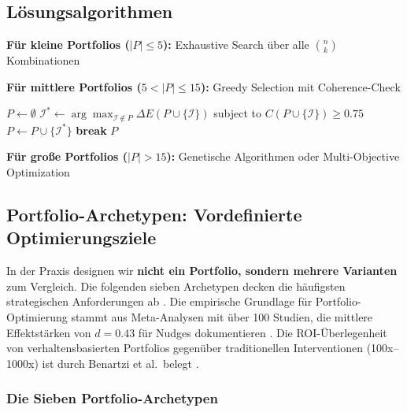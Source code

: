 \subsection{Lösungsalgorithmen}

\textbf{Für kleine Portfolios ($|P| \leq 5$):} Exhaustive Search über alle $\binom{n}{k}$ Kombinationen

\textbf{Für mittlere Portfolios ($5 < |P| \leq 15$):} Greedy Selection mit Coherence-Check

\begin{algorithm}[H]
\caption{Greedy Portfolio Construction}
\label{alg:20-greedy}
\begin{algorithmic}[1]
\State $P \leftarrow \emptyset$
    \State $\mathcal{I}^* \leftarrow \arg\max_{\mathcal{I} \notin P} \Delta E(P \cup \{\mathcal{I}\})$ subject to $C(P \cup \{\mathcal{I}\}) \geq 0.75$
        \State $P \leftarrow P \cup \{\mathcal{I}^*\}$
    \Else
        \State \textbf{break}
    \EndIf
\EndWhile
\State \Return $P$
\end{algorithmic}
\end{algorithm}

\textbf{Für große Portfolios ($|P| > 15$):} Genetische Algorithmen oder Multi-Objective Optimization


\subsection{Portfolio-Archetypen: Vordefinierte Optimierungsziele}
\label{sec:20-archetypes}

In der Praxis designen wir \textbf{nicht ein Portfolio, sondern mehrere Varianten} zum Vergleich. Die folgenden sieben Archetypen decken die häufigsten strategischen Anforderungen ab \citep{hummel2019effective, szaszi2018systematic}. Die empirische Grundlage für Portfolio-Optimierung stammt aus Meta-Analysen mit über 100 Studien, die mittlere Effektstärken von $d = 0.43$ für Nudges dokumentieren \citep{hummel2019effective}. Die ROI-Überlegenheit von verhaltensbasierten Portfolios gegenüber traditionellen Interventionen (100x--1000x) ist durch Benartzi et al.\ belegt \citep{benartzi2017should}.

\subsubsection{Die Sieben Portfolio-Archetypen}

